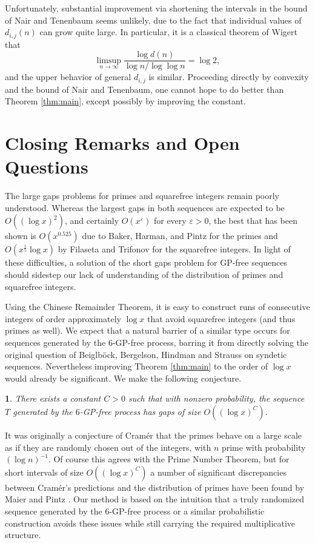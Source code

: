 \documentclass[12pt,english,BCOR7.5mm]{amsart}
\numberwithin{equation}{section}
\numberwithin{figure}{section}
\theoremstyle{definition}
\theoremstyle{plain}
\theoremstyle{plain}
\theoremstyle{plain}
\theoremstyle{definition}
\theoremstyle{plain}
\theoremstyle{plain}
\newtheorem{conjecture}[thm]{\protect\conjecturename}
\providecommand{\conjecturename}{Conjecture}
\begin{document}
Unfortunately, substantial improvement via shortening the intervals
in the bound of Nair and Tenenbaum seems unlikely, due to the fact
that individual values of $d_{i,j}(n)$ can grow quite large. In particular,
it is a classical theorem of Wigert that
\[
\limsup_{n\rightarrow\infty}\frac{\log d(n)}{\log n/\log\log n}=\log2,
\]
and the upper behavior of general $d_{i,j}$ is similar. Proceeding
directly by convexity and the bound of Nair and Tenenbaum, one cannot
hope to do better than Theorem \ref{thm:main}, except possibly by
improving the constant.

\section*{Closing Remarks and Open Questions}

The large gaps problems for primes and squarefree integers remain
poorly understood. Whereas the largest gaps in both sequences are
expected to be $O((\log x)^{2})$, and certainly $O(x^{\varepsilon})$
for every $\varepsilon>0$, the best that has been shown is $O(x^{0.525})$
due to Baker, Harman, and Pintz \cite{BHP} for the primes and $O(x^{\frac{1}{5}}\log x)$
by Filaseta and Trifonov \cite{FT} for the squarefree integers. In
light of these difficulties, a solution of the short gaps problem
for GP-free sequences should sidestep our lack of understanding of
the distribution of primes and squarefree integers.

Using the Chinese Remainder Theorem, it is easy to construct runs
of consecutive integers of order approximately $\log x$ that avoid
squarefree integers (and thus primes as well). We expect that a natural
barrier of a similar type occurs for sequences generated by the $6$-GP-free
process, barring it from directly solving the original question of
Beiglböck, Bergelson, Hindman and Strauss on syndetic sequences. Nevertheless
improving Theorem \ref{thm:main} to the order of $\log x$ would
already be significant. We make the following conjecture.
\begin{conjecture}
There exists a constant $C>0$ such that with nonzero probability,
the sequence $T$ generated by the $6$-GP-free process has gaps of
size $O((\log x)^{C})$.
\end{conjecture}
It was originally a conjecture of Cramér \cite{Cramer} that the primes
behave on a large scale as if they are randomly chosen out of the
integers, with $n$ prime with probability $(\log n)^{-1}$. Of course
this agrees with the Prime Number Theorem, but for short intervals
of size $O((\log x)^{C})$ a number of significant discrepancies between
Cramér's predictions and the distribution of primes have been found
by Maier \cite{Maier} and Pintz \cite{Pintz}. Our method is based
on the intuition that a truly randomized sequence generated by the
$6$-GP-free process or a similar probabilistic construction avoids
these issues while still carrying the required multiplicative structure.
\end{document}
